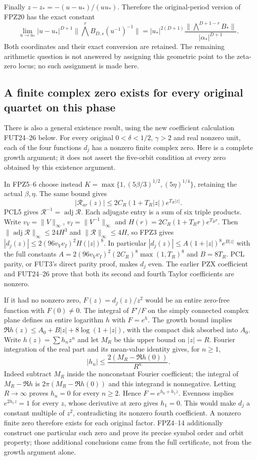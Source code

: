 \documentclass[11pt]{article}
\begin{document}
Finally $z-z_* =-(u-u_*)/(uu_*)$. Therefore the original-period version
of FPZ20 has the exact constant
\[
 \lim_{u\to u_*}|u-u_*|^{D+1}
 \|\bigwedge^r B_{D,s}(u^{-1})^{-1}\|
 =|u_*|^{2(D+1)}
 \frac{\|\bigwedge^{D+1-r}B_*\|}{|\alpha_*|^{D+1}}.
 \tag{FPZ24}
\]
Both coordinates and their exact conversion are retained. The remaining
arithmetic question is not answered by assigning this geometric point
to the zeta-zero locus; no such assignment is made here.

\subsection{A finite complex zero exists for every original quartet on this phase}
There is also a general existence result, using the new coefficient
calculation FUT24--26 below. For every original
$0<\delta<1/2$, $\gamma>2$ and real nonzero unit, each of the four
functions $d_j$ has a nonzero finite complex zero. Here is a complete
growth argument; it does not assert the five-orbit condition at every
zero obtained by this existence argument.

In FPZ5--6 choose instead
$K=\max\{1,(5\beta/3)^{1/2},(5\eta)^{1/4}\}$, retaining the actual
$\beta,\eta$. The same bound gives
\[
 |\mathcal R_{ar}(z)|\le 2C_R(1+T_R|z|)e^{T_R|z|}.
 \tag{FPZ25}
\]
PCL5 gives $\mathcal R^{-1}=\operatorname{adj}\mathcal R$.
Each adjugate entry is a sum of six triple products. Write
$v_V=\|V\|_\infty$, $v_I=\|V^{-1}\|_\infty$ and
$H(r)=2C_R(1+T_Rr)e^{T_Rr}$. Then
$\|\operatorname{adj}\mathcal R\|_\infty\le24H^3$ and
$\|\mathcal R\|_\infty\le4H$, so FPZ3 gives
$|d_j(z)|\le2(96v_Vv_I)^2H(|z|)^8$. In particular
$|d_j(z)|\le A(1+|z|)^8e^{B|z|}$ with the full constants
$A=2(96v_Vv_I)^2(2C_R)^8\max(1,T_R)^8$ and $B=8T_R$.
PCL parity, or FUT3's direct parity proof, makes $d_j$ even.
The earlier PZX coefficient and FUT24--26 prove that both its
second and fourth Taylor coefficients are nonzero.

If it had no nonzero zero, $F(z)=d_j(z)/z^2$ would be an entire
zero-free function with $F(0)\ne0$. The integral of $F'/F$ on the
simply connected complex plane defines an entire logarithm $h$ with
$F=e^h$. The growth bound implies
$\Re h(z)\le A_0+B|z|+8\log(1+|z|)$, with the compact disk
absorbed into $A_0$. Write $h(z)=\sum h_nz^n$ and let $M_R$ be
this upper bound on $|z|=R$. Fourier integration of the real part
and its mean-value identity gives, for $n\ge1$,
\[
 |h_n|\le\frac{2(M_R-\Re h(0))}{R^n}.
 \tag{FPZ26}
\]
Indeed subtract $M_R$ inside the nonconstant Fourier coefficient;
the integral of $M_R-\Re h$ is $2\pi(M_R-\Re h(0))$ and this
integrand is nonnegative. Letting $R\to\infty$ proves $h_n=0$
for every $n\ge2$. Hence $F=e^{h_0+h_1z}$. Evenness implies
$e^{2h_1z}=1$ for every $z$, whose derivative at zero gives
$h_1=0$. This would make $d_j$ a constant multiple of $z^2$,
contradicting its nonzero fourth coefficient. A nonzero finite zero
therefore exists for each original factor. FPZ4--14 additionally
construct one particular such zero and prove its precise symbol order
and orbit property; those additional conclusions came from the full
certificate, not from the growth argument alone.
\end{document}
